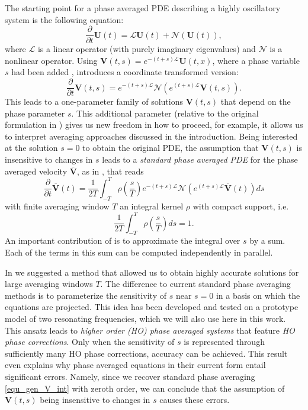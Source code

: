 \documentclass[a4,12pt]{article}
\newcommand{\pp}[2]{\frac{\partial #1}{\partial #2}}
\newcommand{\V}{\mathbf{V}}
\newcommand{\U}{\mathbf{U}}
\newcommand{\opL}{\mathcal{L}}
\newcommand{\opN}{\mathcal{N}}
\begin{document}
The starting point for a phase averaged PDE describing a highly oscillatory system is the following equation:
$$ \pp{}{t} \U(t) = \opL\U(t) + \opN(\U(t)),$$
where $\opL$ is a linear operator (with purely imaginary eigenvalues) and $\opN$ is a nonlinear operator. Using $\V(t,s) = e^{-(t+s) \opL} \U(t,x)$, where a phase variable $s$ had been added \citet{Bauer22}, introduces a coordinate transformed version:
\begin{equation}\label{equ_gen_V_s}
 \pp{}{t} \V(t,s) = e^{-(t+s) \opL} \opN \left(e^{ (t+s) \opL} \V(t,s) \right).
\end{equation}
This leads to a one-parameter family of solutions $\V(t,s)$ that depend on the phase parameter $s$. This additional parameter (relative to the original formulation in
\citet{haut2014asymptotic}) gives us new freedom in how to proceed, for example, it allows us to interpret averaging approaches discussed in the introduction. Being interested at the solution $s=0$ to obtain the original PDE, the assumption that $\V(t,s)$ is insensitive to changes in $s$ leads to a
 \emph{standard phase averaged PDE} for the phase averaged velocity  $\overline{\V}$, as in \citet{haut2014asymptotic}, that reads
 \begin{equation}\label{equ_gen_V_int}
   \pp{}{t}  \overline{\V}( t) =
   \frac{1}{2T} \int_{-T}^{T} \rho(\frac{s}{T}) e^{- (t+s) \opL} \opN\left(e^{ (t+s) \opL}
   \overline{\V}(  t) \right)  ds
\end{equation}
with finite averaging window $T$ an integral kernel $\rho$ with compact support, i.e.
\begin{equation}\label{normalization}
\frac{1}{2T}\int_{-T}^{T} \rho\left(\frac{s}{T}\right)ds=1.
\end{equation}
An important contribution of \citet{haut2014asymptotic} is to approximate the integral over $s$ by a sum. Each of the terms in this sum can be computed independently in parallel.

In \cite{Bauer22} we suggested a method that allowed us to obtain highly accurate solutions for large averaging windows $T$. The difference to current standard phase averaging methods is to parameterize the sensitivity of $s$ near $s = 0$ in a basis on which the equations are projected. This idea has been developed and tested on a prototype model of two resonating frequencies, which we will also use here in this work. This ansatz leads to \emph{higher order (HO) phase averaged systems} that feature \emph{HO phase corrections}. Only when the sensitivity of $s$ is represented through sufficiently many HO phase corrections, accuracy can be achieved. This result even explains why phase averaged equations in their current form entail significant errors. Namely, since we recover standard phase averaging \eqref{equ_gen_V_int} with zeroth order, we can conclude that the assumption of $\V(t,s)$ being insensitive to changes in $s$ causes these errors.
\end{document}

